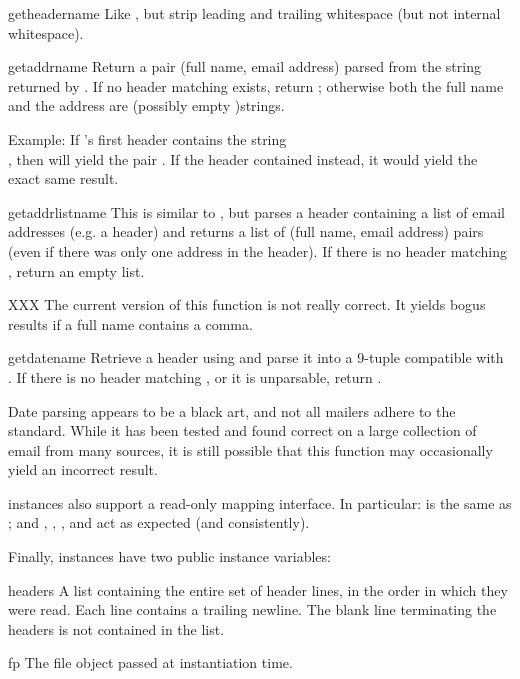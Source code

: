 \begin{funcdesc}{getheader}{name}
Like , but strip leading and trailing
whitespace (but not internal whitespace).
\end{funcdesc}

\begin{funcdesc}{getaddr}{name}
Return a pair (full name, email address) parsed from the string
returned by .  If no header matching
 exists, return ; otherwise both the full
name and the address are (possibly empty )strings.

Example: If 's first  header contains the string\\
, then
 will yield the pair
.
If the header contained
 instead, it would yield the
exact same result.
\end{funcdesc}

\begin{funcdesc}{getaddrlist}{name}
This is similar to , but parses a header
containing a list of email addresses (e.g. a  header) and
returns a list of (full name, email address) pairs (even if there was
only one address in the header).  If there is no header matching
, return an empty list.

XXX The current version of this function is not really correct.  It
yields bogus results if a full name contains a comma.
\end{funcdesc}

\begin{funcdesc}{getdate}{name}
Retrieve a header using  and parse it into a 9-tuple
compatible with .  If there is no header matching
, or it is unparsable, return .

Date parsing appears to be a black art, and not all mailers adhere to
the standard.  While it has been tested and found correct on a large
collection of email from many sources, it is still possible that this
function may occasionally yield an incorrect result.
\end{funcdesc}

 instances also support a read-only mapping interface.
In particular:  is the same as ;
and , , ,
 and  act as expected (and
consistently).

Finally,  instances have two public instance variables:

\begin{datadesc}{headers}
A list containing the entire set of header lines, in the order in
which they were read.  Each line contains a trailing newline.  The
blank line terminating the headers is not contained in the list.
\end{datadesc}

\begin{datadesc}{fp}
The file object passed at instantiation time.
\end{datadesc}
